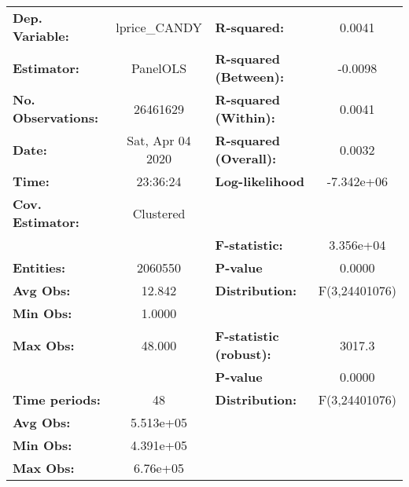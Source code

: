 \documentclass{report}a
\begin{document}
\begin{center}
\begin{tabular}{lclc}
\toprule
\textbf{Dep. Variable:}       &   lprice\_CANDY    & \textbf{  R-squared:         }   &      0.0041      \\
\textbf{Estimator:}           &      PanelOLS      & \textbf{  R-squared (Between):}  &     -0.0098      \\
\textbf{No. Observations:}    &      26461629      & \textbf{  R-squared (Within):}   &      0.0041      \\
\textbf{Date:}                &  Sat, Apr 04 2020  & \textbf{  R-squared (Overall):}  &      0.0032      \\
\textbf{Time:}                &      23:36:24      & \textbf{  Log-likelihood     }   &    -7.342e+06    \\
\textbf{Cov. Estimator:}      &     Clustered      & \textbf{                     }   &                  \\
\textbf{}                     &                    & \textbf{  F-statistic:       }   &    3.356e+04     \\
\textbf{Entities:}            &      2060550       & \textbf{  P-value            }   &      0.0000      \\
\textbf{Avg Obs:}             &       12.842       & \textbf{  Distribution:      }   &  F(3,24401076)   \\
\textbf{Min Obs:}             &       1.0000       & \textbf{                     }   &                  \\
\textbf{Max Obs:}             &       48.000       & \textbf{  F-statistic (robust):} &      3017.3      \\
\textbf{}                     &                    & \textbf{  P-value            }   &      0.0000      \\
\textbf{Time periods:}        &         48         & \textbf{  Distribution:      }   &  F(3,24401076)   \\
\textbf{Avg Obs:}             &     5.513e+05      & \textbf{                     }   &                  \\
\textbf{Min Obs:}             &     4.391e+05      & \textbf{                     }   &                  \\
\textbf{Max Obs:}             &      6.76e+05      & \textbf{                     }   &                  \\
\bottomrule
\end{tabular}
\begin{tabular}{lcccccc}

\end{tabular}
\end{center}
\end{document}
